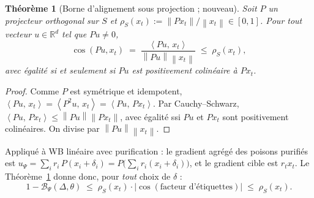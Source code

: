 \documentclass[11pt,a4paper]{article}
\theoremstyle{plain}
\newtheorem{theorem}{Théorème}[section]
\theoremstyle{definition}
\theoremstyle{remark}
\newcommand{\R}{\mathbb{R}}
\newcommand{\B}{\mathcal{B}}
\newcommand{\norm}[1]{\left\lVert #1 \right\rVert}
\newcommand{\inner}[2]{\left\langle #1,\, #2 \right\rangle}
\newcommand{\xt}{x_t}
\DeclareMathOperator{\cosang}{cos}
\begin{document}
\begin{theorem}[Borne d'alignement sous projection ; nouveau]\label{thm:rho}
Soit $P$ un projecteur orthogonal sur $S$ et $\rho_S(\xt):=\norm{P\xt}/\norm{\xt}\in[0,1]$. Pour
tout vecteur $u\in\R^d$ tel que $Pu\neq0$,
\[
\cosang(Pu,\xt)\;=\;\frac{\inner{Pu}{\xt}}{\norm{Pu}\norm{\xt}}\;\le\;\rho_S(\xt),
\]
avec égalité si et seulement si $Pu$ est positivement colinéaire à $P\xt$.
\end{theorem}
\begin{proof}
Comme $P$ est symétrique et idempotent, $\inner{Pu}{\xt}=\inner{P^2u}{\xt}=\inner{Pu}{P\xt}$. Par
Cauchy--Schwarz, $\inner{Pu}{P\xt}\le\norm{Pu}\norm{P\xt}$, avec égalité ssi $Pu$ et $P\xt$ sont
positivement colinéaires. On divise par $\norm{Pu}\norm{\xt}$.
\end{proof}

Appliqué à WB linéaire avec purification : le gradient agrégé des poisons purifiés est
$u_\Psi=\sum_i r_i\,P(x_i+\delta_i)=P\big(\sum_i r_i(x_i+\delta_i)\big)$, et le gradient cible
est $r_t\xt$. Le Théorème~\ref{thm:rho} donne donc, pour \emph{tout} choix de $\delta$ :
\begin{equation}\label{eq:rho-bound}
1-\B_\Psi(\Delta,\theta)\;\le\;\rho_S(\xt)\cdot|\cosang(\text{facteur d'étiquettes})|\;\le\;\rho_S(\xt).
\end{equation}
\end{document}
